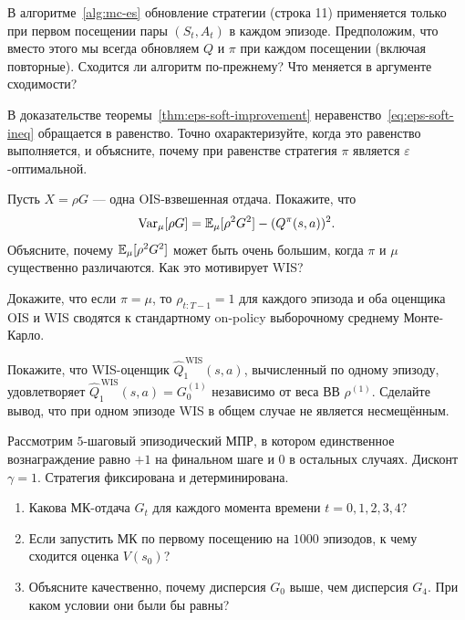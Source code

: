 \begin{exercise}
\label{ex:mc-exploring-starts}
В алгоритме~\ref{alg:mc-es} обновление стратегии (строка 11) применяется только при первом посещении пары $(S_t, A_t)$ в каждом эпизоде.  Предположим, что вместо этого мы всегда обновляем $Q$ и $\pi$ при каждом посещении (включая повторные).  Сходится ли алгоритм по-прежнему?  Что меняется в аргументе сходимости?
\end{exercise}

\begin{exercise}
\label{ex:mc-eps-soft-equality}
В доказательстве теоремы~\ref{thm:eps-soft-improvement} неравенство~\eqref{eq:eps-soft-ineq} обращается в равенство.  Точно охарактеризуйте, когда это равенство выполняется, и объясните, почему при равенстве стратегия $\pi$ является $\varepsilon$-оптимальной.
\end{exercise}

\begin{exercise}
\label{ex:mc-ois-variance}
Пусть $X = \rho G$ --- одна OIS-взвешенная отдача.  Покажите, что
\[
  \operatorname{Var}_\mu[\rho G] = \operatorname{\mathbb{E}}_\mu[\rho^2 G^2] - (Q^\pi(s,a))^2.
\]
Объясните, почему $\operatorname{\mathbb{E}}_\mu[\rho^2 G^2]$ может быть очень большим, когда $\pi$ и $\mu$ существенно различаются.  Как это мотивирует WIS?
\end{exercise}

\begin{exercise}
\label{ex:mc-is-reduction}
Докажите, что если $\pi = \mu$, то $\rho_{t:T-1} = 1$ для каждого эпизода и оба оценщика OIS и WIS сводятся к стандартному on-policy выборочному среднему Монте-Карло.
\end{exercise}

\begin{exercise}
\label{ex:mc-wis-bias}
Покажите, что WIS-оценщик $\widehat{Q}_1^{\,\mathrm{WIS}}(s,a)$, вычисленный по одному эпизоду, удовлетворяет $\widehat{Q}_1^{\,\mathrm{WIS}}(s,a) = G_0^{(1)}$ независимо от веса ВВ $\rho^{(1)}$.  Сделайте вывод, что при одном эпизоде WIS в общем случае не является несмещённым.
\end{exercise}

\begin{exercise}
\label{ex:mc-td-comparison}
Рассмотрим $5$-шаговый эпизодический МПР, в котором единственное вознаграждение равно $+1$ на финальном шаге и $0$ в остальных случаях.  Дисконт $\gamma = 1$.  Стратегия фиксирована и детерминирована.
\begin{enumerate}[label=(\alph*)]
  \item Какова МК-отдача $G_t$ для каждого момента времени $t = 0, 1, 2, 3, 4$?
  \item Если запустить МК по первому посещению на $1000$ эпизодов, к чему сходится оценка $V(s_0)$?
  \item Объясните качественно, почему дисперсия $G_0$ выше, чем дисперсия $G_4$.  При каком условии они были бы равны?
\end{enumerate}
\end{exercise}
